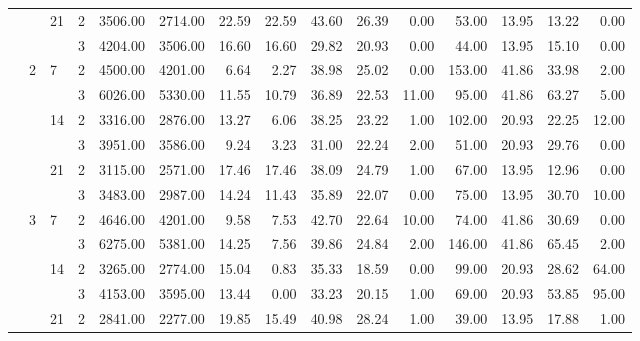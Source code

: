 \begin{tabular}{llllrrrrrrrrrrr}
\cline{3-15}
              &   & \multirow{2}{*}{21} & 2 &  3506.00 &   2714.00 & 22.59 &   22.59 &   43.60 &   26.39 &    0.00 &   53.00 &   13.95 & 13.22 &     0.00 \\
              &   &    & 3 &  4204.00 &   3506.00 & 16.60 &   16.60 &   29.82 &   20.93 &    0.00 &   44.00 &   13.95 & 15.10 &     0.00 \\
\cline{2-15}
\cline{3-15}
              & \multirow{6}{*}{2} & \multirow{2}{*}{7} & 2 &  4500.00 &   4201.00 &  6.64 &    2.27 &   38.98 &   25.02 &    0.00 &  153.00 &   41.86 & 33.98 &     2.00 \\
              &   &    & 3 &  6026.00 &   5330.00 & 11.55 &   10.79 &   36.89 &   22.53 &   11.00 &   95.00 &   41.86 & 63.27 &     5.00 \\
\cline{3-15}
              &   & \multirow{2}{*}{14} & 2 &  3316.00 &   2876.00 & 13.27 &    6.06 &   38.25 &   23.22 &    1.00 &  102.00 &   20.93 & 22.25 &    12.00 \\
              &   &    & 3 &  3951.00 &   3586.00 &  9.24 &    3.23 &   31.00 &   22.24 &    2.00 &   51.00 &   20.93 & 29.76 &     0.00 \\
\cline{3-15}
              &   & \multirow{2}{*}{21} & 2 &  3115.00 &   2571.00 & 17.46 &   17.46 &   38.09 &   24.79 &    1.00 &   67.00 &   13.95 & 12.96 &     0.00 \\
              &   &    & 3 &  3483.00 &   2987.00 & 14.24 &   11.43 &   35.89 &   22.07 &    0.00 &   75.00 &   13.95 & 30.70 &    10.00 \\
\cline{2-15}
\cline{3-15}
              & \multirow{6}{*}{3} & \multirow{2}{*}{7} & 2 &  4646.00 &   4201.00 &  9.58 &    7.53 &   42.70 &   22.64 &   10.00 &   74.00 &   41.86 & 30.69 &     0.00 \\
              &   &    & 3 &  6275.00 &   5381.00 & 14.25 &    7.56 &   39.86 &   24.84 &    2.00 &  146.00 &   41.86 & 65.45 &     2.00 \\
\cline{3-15}
              &   & \multirow{2}{*}{14} & 2 &  3265.00 &   2774.00 & 15.04 &    0.83 &   35.33 &   18.59 &    0.00 &   99.00 &   20.93 & 28.62 &    64.00 \\
              &   &    & 3 &  4153.00 &   3595.00 & 13.44 &    0.00 &   33.23 &   20.15 &    1.00 &   69.00 &   20.93 & 53.85 &    95.00 \\
\cline{3-15}
              &   & \multirow{2}{*}{21} & 2 &  2841.00 &   2277.00 & 19.85 &   15.49 &   40.98 &   28.24 &    1.00 &   39.00 &   13.95 & 17.88 &     1.00 \\

\end{tabular}
